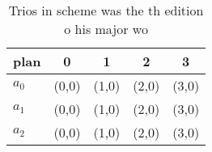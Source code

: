 \documentclass[a4paper]{article}
\begin{document}
\begin{table}
\begin{adjustbox}{width=0.6\columnwidth}
\begin{tabular}{|l|l|l|l|l|}
\hline
\textbf{plan} & \multicolumn{1}{c|}{\textbf{0}} & \multicolumn{1}{c|}{\textbf{1}} & \multicolumn{1}{c|}{\textbf{2}} & \multicolumn{1}{c|}{\textbf{3}} \\ \hline
\textbf{$a_0$}  & (0,0) & (1,0) & (2,0) & (3,0) \\ \hline
\textbf{$a_1$}  & (0,0) & (1,0) & (2,0) & (3,0) \\ \hline
\textbf{$a_2$}  & (0,0) & (1,0) & (2,0) & (3,0) \\ \hline
\end{tabular}
\end{adjustbox}
\caption{Trios in scheme was the th edition o his major wo
}
\end{table}
\end{document}
